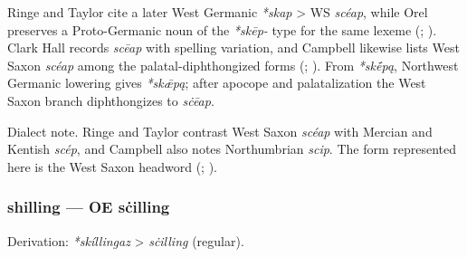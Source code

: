 \documentclass[
  british,
  a4paper,
]{article}
\begin{document}
Ringe and Taylor cite a later West Germanic \emph{*skap} \textgreater{}
WS \emph{scéap}, while Orel preserves a Proto-Germanic noun of the
\emph{*skēp-} type for the same lexeme
(;
). Clark Hall records
\emph{scēap} with spelling variation, and Campbell likewise lists West
Saxon \emph{scéap} among the palatal-diphthongized forms
(;
). From
\emph{*skḗpą}, Northwest Germanic lowering gives \emph{*skǣpą}; after
apocope and palatalization the West Saxon branch diphthongizes to
\emph{sċēap}.

Dialect note. Ringe and Taylor contrast West Saxon \emph{scéap} with
Mercian and Kentish \emph{scép}, and Campbell also notes Northumbrian
\emph{scip}. The form represented here is the West Saxon headword
(;
).

\subsubsection{shilling --- OE sċilling}\label{shilling-oe-sux10billing}

Derivation: \emph{*skíllingaz} \textgreater{} \emph{sċilling} (regular).

\begingroup
\setlength{\fboxsep}{6pt}
\end{document}
